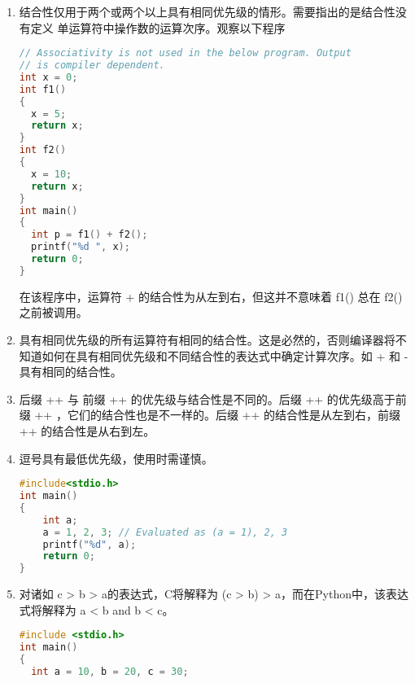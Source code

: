 \documentclass[10pt,a4paper%
tablecaptionabove]{article}
\def\tf{\ttfamily}
\begin{document}
\begin{CJK}{UTF8}{gkai}
\begin{enumerate}
\item 结合性仅用于两个或两个以上具有相同优先级的情形。需要指出的是结合性没有定义  单运算符中操作数的运算次序。观察以下程序
\begin{lstlisting}[language=c,backgroundcolor=\color{red!10}]
// Associativity is not used in the below program. Output 
// is compiler dependent.
int x = 0; 
int f1()
{
  x = 5;
  return x;
} 
int f2()
{
  x = 10;
  return x;
}
int main()
{
  int p = f1() + f2();
  printf("%d ", x);
  return 0;
}
\end{lstlisting}
在该程序中，运算符 {\tf +} 的结合性为从左到右，但这并不意味着 {\tf f1()} 总在 {\tf f2()} 之前被调用。
\item 具有相同优先级的所有运算符有相同的结合性。这是必然的，否则编译器将不知道如何在具有相同优先级和不同结合性的表达式中确定计算次序。如 {\tf +} 和 {\tf -} 具有相同的结合性。
\item 后缀 {\tf ++} 与 前缀 {\tf ++} 的优先级与结合性是不同的。后缀 {\tf ++} 的优先级高于前缀 {\tf ++} ，它们的结合性也是不一样的。后缀 {\tf ++} 的结合性是从左到右，前缀 {\tf ++} 的结合性是从右到左。

\item 逗号具有最低优先级，使用时需谨慎。
  \begin{lstlisting}[language=c,backgroundcolor=\color{red!10}]
#include<stdio.h> 
int main()
{
    int a;
    a = 1, 2, 3; // Evaluated as (a = 1), 2, 3
    printf("%d", a);
    return 0;
}    
  \end{lstlisting}
\item 对诸如 {\tf c > b > a}的表达式，C将解释为 {\tf (c > b) > a}，而在Python中，该表达式将解释为 {\tf a < b and b < c}。
  \begin{lstlisting}[language=c,backgroundcolor=\color{red!10}]
#include <stdio.h>
int main()
{
  int a = 10, b = 20, c = 30;
 

\end{lstlisting}
\end{enumerate}
\end{CJK}
\end{document}
